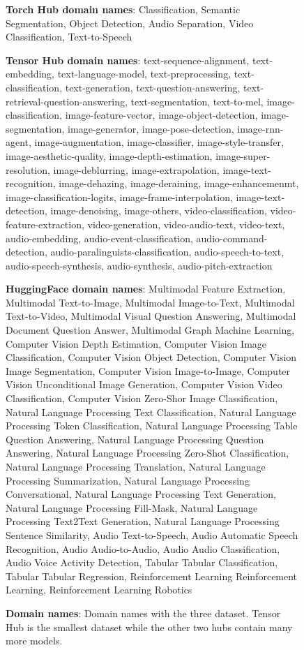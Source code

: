 \begin{figure}
\begin{tcolorbox}
    \textbf{Torch Hub domain names}: Classification, Semantic Segmentation, Object Detection, Audio Separation, Video Classification, Text-to-Speech
\end{tcolorbox}
\begin{tcolorbox}
    \textbf{Tensor Hub domain names}: text-sequence-alignment, text-embedding, text-language-model, text-preprocessing, text-classification, text-generation, text-question-answering, text-retrieval-question-answering, text-segmentation, text-to-mel, image-classification, image-feature-vector, image-object-detection, image-segmentation, image-generator, image-pose-detection, image-rnn-agent, image-augmentation, image-classifier, image-style-transfer, image-aesthetic-quality, image-depth-estimation, image-super-resolution, image-deblurring, image-extrapolation, image-text-recognition, image-dehazing, image-deraining, image-enhancemenmt, image-classification-logits, image-frame-interpolation, image-text-detection, image-denoising, image-others, video-classification, video-feature-extraction, video-generation, video-audio-text, video-text, audio-embedding, audio-event-classification, audio-command-detection, audio-paralinguists-classification, audio-speech-to-text, audio-speech-synthesis, audio-synthesis, audio-pitch-extraction
\end{tcolorbox}
\begin{tcolorbox}
    \textbf{HuggingFace domain names}: Multimodal Feature Extraction, Multimodal Text-to-Image, Multimodal Image-to-Text, Multimodal Text-to-Video, Multimodal Visual Question Answering, Multimodal Document Question Answer, Multimodal Graph Machine Learning, Computer Vision Depth Estimation, Computer Vision Image Classification, Computer Vision Object Detection, Computer Vision Image Segmentation, Computer Vision Image-to-Image, Computer Vision Unconditional Image Generation, Computer Vision Video Classification, Computer Vision Zero-Shor Image Classification, Natural Language Processing Text Classification, Natural Language Processing Token Classification, Natural Language Processing Table Question Answering, Natural Language Processing Question Answering, Natural Language Processing Zero-Shot Classification, Natural Language Processing Translation, Natural Language Processing Summarization, Natural Language Processing Conversational, Natural Language Processing Text Generation, Natural Language Processing Fill-Mask, Natural Language Processing Text2Text Generation, Natural Language Processing Sentence Similarity, Audio Text-to-Speech, Audio Automatic Speech Recognition, Audio Audio-to-Audio, Audio Audio Classification, Audio Voice Activity Detection, Tabular Tabular Classification, Tabular Tabular Regression, Reinforcement Learning Reinforcement Learning, Reinforcement Learning Robotics
\end{tcolorbox}
\caption{\textbf{Domain names}: Domain names with the three dataset. Tensor Hub is the smallest dataset while the other two hubs contain many more models.}
    \label{fig:domains}
\end{figure}


